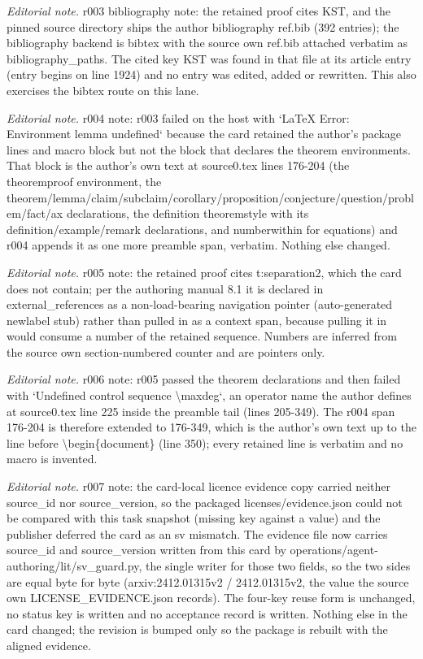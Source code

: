 \documentclass[10pt,a4paper]{article}
\theoremstyle{definition}
\numberwithin{equation}{section}
\begin{document}
\noindent\textit{Editorial note.} r003 bibliography note: the retained proof cites KST, and the pinned source directory ships the author bibliography ref.bib (392 entries); the bibliography backend is bibtex with the source own ref.bib attached verbatim as bibliography\_paths. The cited key KST was found in that file at its article entry (entry begins on line 1924) and no entry was edited, added or rewritten. This also exercises the bibtex route on this lane.\par\medskip
\noindent\textit{Editorial note.} r004 note: r003 failed on the host with `LaTeX Error: Environment lemma undefined` because the card retained the author's package lines and macro block but not the block that declares the theorem environments. That block is the author's own text at source0.tex lines 176-204 (the theoremproof environment, the theorem/lemma/claim/subclaim/corollary/proposition/conjecture/question/problem/fact/ax declarations, the definition theoremstyle with its definition/example/remark declarations, and numberwithin for equations) and r004 appends it as one more preamble span, verbatim. Nothing else changed.\par\medskip
\noindent\textit{Editorial note.} r005 note: the retained proof cites t:separation2, which the card does not contain; per the authoring manual 8.1 it is declared in external\_references as a non-load-bearing navigation pointer (auto-generated newlabel stub) rather than pulled in as a context span, because pulling it in would consume a number of the retained sequence. Numbers are inferred from the source own section-numbered counter and are pointers only.\par\medskip
\noindent\textit{Editorial note.} r006 note: r005 passed the theorem declarations and then failed with `Undefined control sequence \textbackslash{}maxdeg`, an operator name the author defines at source0.tex line 225 inside the preamble tail (lines 205-349). The r004 span 176-204 is therefore extended to 176-349, which is the author's own text up to the line before \textbackslash{}begin\{document\} (line 350); every retained line is verbatim and no macro is invented.\par\medskip
\noindent\textit{Editorial note.} r007 note: the card-local licence evidence copy carried neither source\_id nor source\_version, so the packaged licenses/evidence.json could not be compared with this task snapshot (missing key against a value) and the publisher deferred the card as an sv mismatch. The evidence file now carries source\_id and source\_version written from this card by operations/agent-authoring/lit/sv\_guard.py, the single writer for those two fields, so the two sides are equal byte for byte (arxiv:2412.01315v2 / 2412.01315v2, the value the source own LICENSE\_EVIDENCE.json records). The four-key reuse form is unchanged, no status key is written and no acceptance record is written. Nothing else in the card changed; the revision is bumped only so the package is rebuilt with the aligned evidence.\par\medskip
\end{document}
